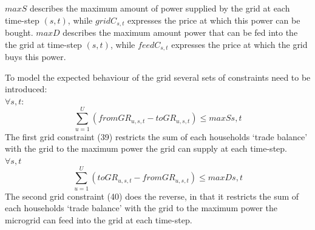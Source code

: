 \documentclass[
	11pt,								%
	DIV10,								%
	a4paper,         					%
	oneside,							%
	headheight=20pt,					%
	footheight=20pt,					%
    parskip=full,						%
    listof=totoc,						%
	bibliography=totoc,					%
	index=totoc,						%
]{scrartcl}
\begin{document}
$maxS$ describes the maximum amount of power supplied by the grid at each time-step $(s,t)$, while $gridC_{s,t}$ expresses the price at which this power can be bought.
$maxD$ describes the maximum amount power that can be fed into the the grid at time-step $(s,t)$, while $feedC_{s,t}$ expresses the price at which the grid buys this power. 

To model the expected behaviour of the grid several sets of constraints need to be introduced:
\\
$\forall s,t$:
\begin{equation}
	\sum_{u=1}^{U}(fromGR_{u,s,t}-toGR_{u,s,t}) \leq maxS{s,t}
\end{equation}
The first grid constraint (39) restricts the sum of each households `trade balance' with the grid to the maximum power the grid can supply at each time-step.
\\
$\forall s,t$
\begin{equation}
	\sum_{u=1}^{U}(toGR_{u,s,t}-fromGR_{u,s,t}) \leq maxD{s,t}
\end{equation}
The second grid constraint (40) does the reverse, in that it restricts the sum of each households `trade balance' with the grid to the maximum power the microgrid can feed into the grid at each time-step.
\end{document}
